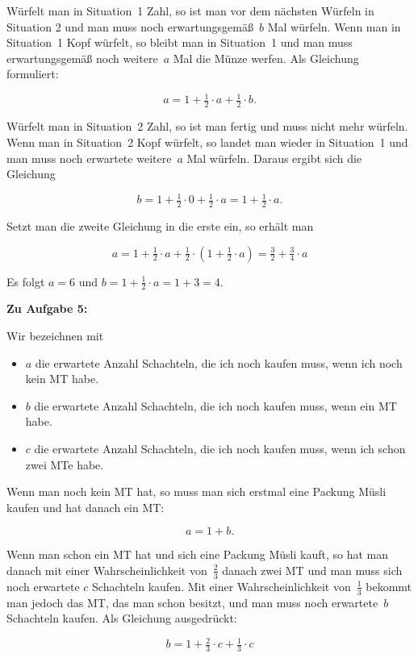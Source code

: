 \documentclass{article}
\begin{document}
Würfelt man in Situation~1 Zahl, so ist man vor dem nächsten Würfeln in Situation 2 und man muss noch erwartungsgemäß~$b$ Mal würfeln. Wenn man in Situation~1 Kopf würfelt, so bleibt man in Situation~1 und man muss erwartungsgemäß noch weitere~$a$ Mal die Münze werfen. Als Gleichung formuliert:

\[ a = 1 + \tfrac{1}{2} \cdot a + \tfrac{1}{2} \cdot b. \]

Würfelt man in Situation~2 Zahl, so ist man fertig und muss nicht mehr würfeln. Wenn man in Situation~2 Kopf würfelt, so landet man wieder in Situation~1 und man muss noch erwartete weitere~$a$ Mal würfeln. Daraus ergibt sich die Gleichung

\[ b = 1 + \tfrac{1}{2} \cdot 0 + \tfrac{1}{2} \cdot a = 1 + \tfrac{1}{2} \cdot a. \]

Setzt man die zweite Gleichung in die erste ein, so erhält man

\[ a = 1 + \tfrac{1}{2} \cdot a + \tfrac{1}{2} \cdot (1 + \tfrac{1}{2} \cdot a) = \tfrac{3}{2} + \tfrac{3}{4} \cdot a \]

Es folgt $a = 6$ und $b = 1 + \tfrac{1}{2} \cdot a = 1 + 3 = 4$.

\textbf{Zu Aufgabe 5:}

Wir bezeichnen mit

\begin{itemize}
  \item $a$ die erwartete Anzahl Schachteln, die ich noch kaufen muss, wenn ich noch kein MT habe.
  \item $b$ die erwartete Anzahl Schachteln, die ich noch kaufen muss, wenn ein MT habe.
  \item $c$ die erwartete Anzahl Schachteln, die ich noch kaufen muss, wenn ich schon zwei MTe habe.
\end{itemize}

Wenn man noch kein MT hat, so muss man sich erstmal eine Packung Müsli kaufen und hat danach ein MT:

\[ a = 1 + b. \]

Wenn man schon ein MT hat und sich eine Packung Müsli kauft, so hat man danach mit einer Wahrscheinlichkeit von~$\tfrac{2}{3}$ danach zwei MT und man muss sich noch erwartete $c$ Schachteln kaufen.
Mit einer Wahrscheinlichkeit von~$\tfrac{1}{3}$ bekommt man jedoch das MT, das man schon besitzt, und man muss noch erwartete~$b$ Schachteln kaufen.
Als Gleichung ausgedrückt:

\[ b = 1 + \tfrac{2}{3} \cdot c + \tfrac{1}{3} \cdot c \]
\end{document}
